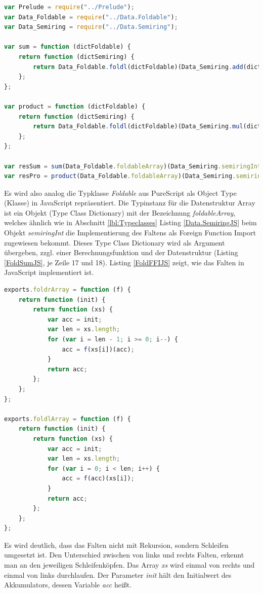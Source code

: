 \documentclass[
12pt,
ngerman,
oneside]
{scrbook} %
\begin{document}
\begin{lstlisting}[language=javascript, style=numbered-and-boxed, caption=Falten in JavaScript, label=FoldSumJS]
var Prelude = require("../Prelude");
var Data_Foldable = require("../Data.Foldable");
var Data_Semiring = require("../Data.Semiring");

var sum = function (dictFoldable) {
	return function (dictSemiring) {
		return Data_Foldable.foldl(dictFoldable)(Data_Semiring.add(dictSemiring))(Data_Semiring.zero(dictSemiring));
	};
};

var product = function (dictFoldable) {
	return function (dictSemiring) {
		return Data_Foldable.foldl(dictFoldable)(Data_Semiring.mul(dictSemiring))(Data_Semiring.one(dictSemiring));
	};
};

var resSum = sum(Data_Foldable.foldableArray)(Data_Semiring.semiringInt)([ 1, 2, 3 ]);
var resPro = product(Data_Foldable.foldableArray)(Data_Semiring.semiringInt)([ 1, 2, 3 ]);
\end{lstlisting}

Es wird also analog die Typklasse \emph{Foldable} aus PureScript als Object Type (Klasse) in JavaScript repräsentiert. Die Typinstanz für die Datenstruktur Array ist ein Objekt (Type Class Dictionary) mit der Bezeichnung \emph{foldableArray}, welches ähnlich wie in Abschnitt \ref{lbl:Typeclasses} Listing \ref{Data.SemiringJS} beim Objekt \emph{semiringInt} die Implementierung des Faltens als Foreign Function Import zugewiesen bekommt. Dieses Type Class Dictionary wird als Argument übergeben, zzgl. einer Berechnungsfunktion und der Datenstruktur (Listing \ref{FoldSumJS}, je Zeile 17 und 18). Listing \ref{FoldFFIJS} zeigt, wie das Falten in JavaScript implementiert ist.

\begin{lstlisting}[language=javascript, style=numbered-and-boxed, caption=Falten als Native-Implementierung in JavaScript, label=FoldFFIJS]
exports.foldrArray = function (f) {
	return function (init) {
		return function (xs) {
			var acc = init;
			var len = xs.length;
			for (var i = len - 1; i >= 0; i--) {
				acc = f(xs[i])(acc);
			}
			return acc;
		};
	};
};

exports.foldlArray = function (f) {
	return function (init) {
		return function (xs) {
			var acc = init;
			var len = xs.length;
			for (var i = 0; i < len; i++) {
				acc = f(acc)(xs[i]);
			}
			return acc;
		};
	};
};
\end{lstlisting}

Es wird deutlich, dass das Falten nicht mit Rekursion, sondern Schleifen umgesetzt ist. Den Unterschied zwischen von links und rechts Falten, erkennt man an den jeweiligen Schleifenköpfen. Das Array \emph{xs} wird einmal von rechts und einmal von links durchlaufen. Der Parameter \emph{init} hält den Initialwert des Akkumulators, dessen Variable \emph{acc} heißt.
\end{document}

